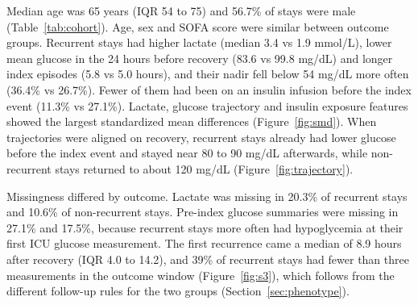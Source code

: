 \documentclass[twocolumn, 8pt]{article}
\begin{document}
Median age was 65 years (IQR 54 to 75) and 56.7\% of stays were male (Table~\ref{tab:cohort}). Age, sex and SOFA score were similar between outcome groups. Recurrent stays had higher lactate (median 3.4 vs 1.9 mmol/L), lower mean glucose in the 24 hours before recovery (83.6 vs 99.8 mg/dL) and longer index episodes (5.8 vs 5.0 hours), and their nadir fell below 54 mg/dL more often (36.4\% vs 26.7\%). Fewer of them had been on an insulin infusion before the index event (11.3\% vs 27.1\%). Lactate, glucose trajectory and insulin exposure features showed the largest standardized mean differences (Figure~\ref{fig:smd}).\cite{austin2009standardized} When trajectories were aligned on recovery, recurrent stays already had lower glucose before the index event and stayed near 80 to 90 mg/dL afterwards, while non-recurrent stays returned to about 120 mg/dL (Figure~\ref{fig:trajectory}).

Missingness differed by outcome.\cite{agniel2018biases} Lactate was missing in 20.3\% of recurrent stays and 10.6\% of non-recurrent stays. Pre-index glucose summaries were missing in 27.1\% and 17.5\%, because recurrent stays more often had hypoglycemia at their first ICU glucose measurement. The first recurrence came a median of 8.9 hours after recovery (IQR 4.0 to 14.2), and 39\% of recurrent stays had fewer than three measurements in the outcome window (Figure~\ref{fig:s3}), which follows from the different follow-up rules for the two groups (Section~\ref{sec:phenotype}).
\end{document}
